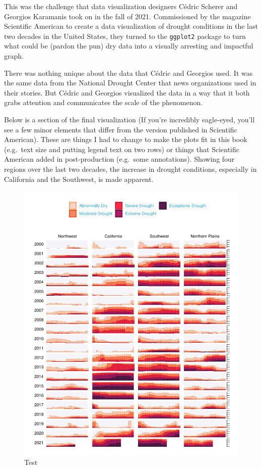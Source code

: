 \documentclass[
]{book}
\begin{document}
This was the challenge that data visualization designers Cédric Scherer and Georgios Karamanis took on in the fall of 2021. Commissioned by the magazine Scientific American to create a data visualization of drought conditions in the last two decades in the United States, they turned to the \texttt{ggplot2} package to turn what could be (pardon the pun) dry data into a visually arresting and impactful graph.

There was nothing unique about the data that Cédric and Georgios used. It was the same data from the National Drought Center that news organizations used in their stories. But Cédric and Georgios visualized the data in a way that it both grabs attention and communicates the scale of the phenomenon.

Below is a section of the final visualization (If you're incredibly eagle-eyed, you'll see a few minor elements that differ from the version published in Scientific American). These are things I had to change to make the plots fit in this book (e.g.~text size and putting legend text on two rows) or things that Scientific American added in post-production (e.g.~some annotations). Showing four regions over the last two decades, the increase in drought conditions, especially in California and the Southwest, is made apparent.

\begin{figure}
\includegraphics[width=1\linewidth]{data-viz_files/figure-latex/unnamed-chunk-3-1} \caption{Test}\label{fig:unnamed-chunk-3}
\end{figure}
\end{document}
